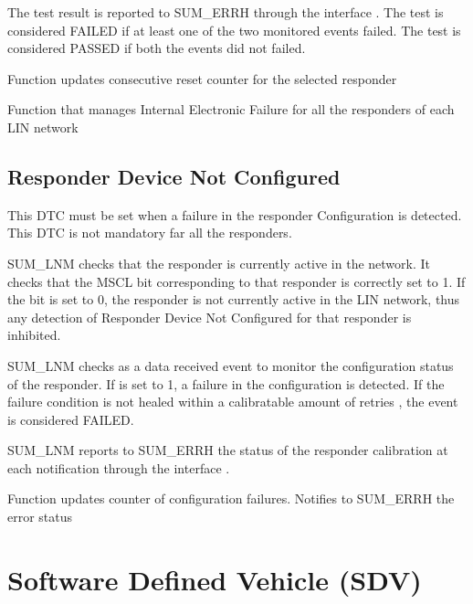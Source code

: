 {
The test result is reported to SUM_ERRH through the interface . The test is considered FAILED if at least one of the two monitored events failed. The test is considered PASSED if both 
the events did not failed.
}
{ }


{}
{}
{}
{}
{Function updates consecutive reset counter for the selected responder}

{}
{}
{}
{}
{Function that manages Internal Electronic Failure for all the responders of each LIN network}

\subsection{Responder Device Not Configured}
This DTC must be set when a failure in the responder Configuration is detected. This DTC is not mandatory far all the responders.

{
SUM_LNM checks that the responder is currently active in the network. It checks that the MSCL bit corresponding to that responder is correctly set to 1. If the bit is set to 0, the responder is not currently active in
the LIN network, thus any detection of Responder Device Not Configured for that responder is inhibited.
}
{}

{
SUM_LNM checks  as a data received event to monitor the configuration status of the responder. If  is set to 1, a failure in the configuration is detected. If the failure condition is not healed
within a calibratable amount of retries , the event is considered FAILED.
}
{   }

{
SUM_LNM reports to SUM_ERRH the status of the responder calibration at each notification through the interface . 
}
{}

{}
{}
{}
{}
{Function updates counter of configuration failures. Notifies to SUM_ERRH the error status}

\section{Software Defined Vehicle (SDV)}
\label{sec:sdv}

